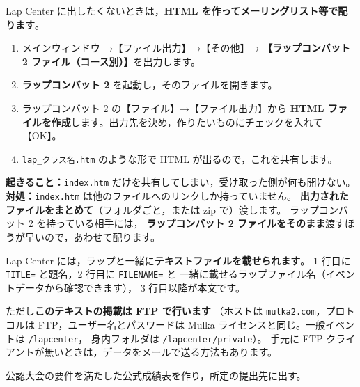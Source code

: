 Lap Center に出したくないときは，\textbf{HTML を作ってメーリングリスト等で配ります}。

\begin{enumerate}
\item メインウィンドウ →【ファイル出力】→【その他】→
      \textbf{【ラップコンバット 2 ファイル（コース別）】}を出力します。\ver
\item \textbf{ラップコンバット 2} を起動し，そのファイルを開きます。
\item ラップコンバット 2 の【ファイル】→【ファイル出力】から
      \textbf{HTML ファイルを作成}します。出力先を決め，作りたいものにチェックを入れて【OK】。
\item \texttt{lap\_クラス名.htm} のような形で HTML が出るので，これを共有します。
\end{enumerate}

\begin{Fail}
\textbf{起きること：}\texttt{index.htm} だけを共有してしまい，受け取った側が何も開けない。\\
\textbf{対処：}\texttt{index.htm} は他のファイルへのリンクしか持っていません。
\textbf{出力されたファイルをまとめて}（フォルダごと，または zip で）渡します。
ラップコンバット 2 を持っている相手には，
\textbf{ラップコンバット 2 ファイルをそのまま}渡すほうが早いので，あわせて配ります。
\end{Fail}

\begin{Note}[備考やコメントを一緒に載せたい場合]
Lap Center には，ラップと一緒に\textbf{テキストファイルを載せられます}。
1 行目に \texttt{TITLE=} と題名，2 行目に \texttt{FILENAME=} と
一緒に載せるラップファイル名（イベントデータから確認できます），
3 行目以降が本文です。

ただし\textbf{このテキストの掲載は FTP で行います}
（ホストは \texttt{mulka2.com}，プロトコルは FTP，ユーザー名とパスワードは
Mulka ライセンスと同じ。一般イベントは \texttt{/lapcenter}，
身内フォルダは \texttt{/lapcenter/private}）。
手元に FTP クライアントが無いときは，データをメールで送る方法もあります。
\end{Note}


\begin{Goal}
公認大会の要件を満たした公式成績表を作り，所定の提出先に出す。
\end{Goal}

